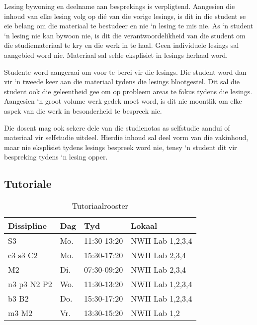         Lesing bywoning en deelname aan besprekings is verpligtend. Aangesien
        die inhoud van elke lesing volg op di\'{e} van die vorige lesings, is
        dit in die student se eie belang om die materiaal te bestudeer en nie
        `n lesing te mis nie. As `n student `n lesing nie kan bywoon nie, is
        dit die verantwoordelikheid van die student om die studiemateriaal te
        kry en die werk in te haal.  Geen individuele lesings sal aangebied
        word nie. Materiaal sal selde eksplisiet in lesings herhaal word.

        Studente word aangeraai om voor te berei vir die lesings. Die
        student word dan vir `n tweede keer aan die materiaal tydens
        die lesings blootgestel. Dit sal die student ook die
        geleentheid gee om op probleem areas te fokus tydens die
        lesings. Aangesien `n groot volume werk gedek moet word, is
        dit nie moontlik om elke aspek van die werk in besonderheid te
        bespreek nie.

        Die dosent mag ook sekere dele van die studienotas as selfstudie aandui
        of materiaal vir selfstudie uitdeel. Hierdie inhoud sal deel vorm van
        die vakinhoud, maar nie eksplisiet tydens lesings bespreek word nie,
        tensy `n student dit vir bespreking tydens `n lesing opper.

    \subsection{Tutoriale}
        \begin{table}[!h]
            \begin{center}
            \begin{tabular}{|l|l|l|l|}
                \hline
                {\bf Dissipline} & {\bf Dag} & {\bf Tyd} & {\bf Lokaal} \\
                \hline
                S3          & Mo.  & 11:30-13:20 & NWII Lab 1,2,3,4 \\
                c3 s3 C2    & Mo.  & 15:30-17:20 & NWII Lab 2,3,4 \\
                M2          & Di.  & 07:30-09:20 & NWII Lab 2,3,4 \\
                n3 p3 N2 P2 & Wo.  & 11:30-13:20 & NWII Lab 1,2,3,4 \\
                b3 B2       & Do.  & 15:30-17:20 & NWII Lab 1,2,3,4 \\
                m3 M2       & Vr.  & 13:30-15:20 & NWII Lab 1,2 \\
                \hline
            \end{tabular}
            \caption{Tutoriaalrooster}
            \label{tab:tutorials}
            \end{center}
        \end{table}

